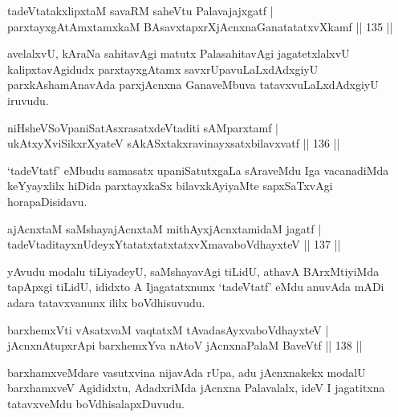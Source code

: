 \begin{shl}
tadeVtatakxlipxtaM savaRM saheVtu Palavajajxgatf |\\
parxtayxgAtAmxtamxkaM BAsavxtapxrXjAcnxnaGanatatatxvXkamf \hfill || 135 ||
\end{shl}

\begin{artha}
avelalxvU, kAraNa sahitavAgi matutx PalasahitavAgi jagatetxlalxvU kalipxtavAgidudx parxtayxgAtamx savxrUpavuLaLxdAdxgiyU parxkAshamAnavAda parxjAcnxna GanaveMbuva tatavxvuLaLxdAdxgiyU iruvudu.
\end{artha}

\begin{shl}
niHsheVSoVpaniSatAsxrasatxdeVtaditi sAMparxtamf |\\
ukAtxyX\s \s viSikxrXyateV sAkASxtakxravinayxsatxbilavxvatf \hfill || 136 ||
\end{shl}

\begin{artha}
`tadeVtatf' eMbudu samasatx upaniSatutxgaLa sAraveMdu Iga vacanadiMda   keYyayxlilx hiDida parxtayxkaSx bilavxkAyiyaMte sapxSaTxvAgi   horapaDisidavu.
\end{artha}

\begin{shl}
ajAcnxtaM saMshayajAcnxtaM mithAyxjAcnxtamidaM jagatf |\\
tadeVtaditayxnUdeyxYtatatxtatxtatxvXmavaboVdhayxteV \hfill || 137 ||
\end{shl}

\begin{artha}
yAvudu modalu tiLiyadeyU, saMshayavAgi tiLidU, athavA BArxMtiyiMda tapApxgi tiLidU, ididxto A Ijagatatxnunx `tadeVtatf' eMdu anuvAda mADi adara tatavxvanunx ililx boVdhisuvudu.
\end{artha}

\begin{shl}
barxhemxVti vAsatxvaM vaqtatxM tAvadasAyxvaboVdhayxteV |\\
jAcnxnAtupxrA\s pi barxhemxYva nAtoV jAcnxnaPalaM BaveVtf \hfill || 138 ||
\end{shl}

\begin{artha}
barxhamxveMdare vasutxvina nijavAda rUpa, adu jAcnxnakekx modalU barxhamxveV Agididxtu, AdadxriMda jAcnxna Palavalalx, ideV I jagatitxna tatavxveMdu boVdhisalapxDuvudu.
\end{artha}


